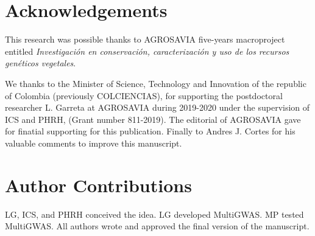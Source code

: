 \documentclass{article}
\begin{document}
\section{Acknowledgements}
This research was possible thanks to AGROSAVIA five-years macroproject entitled \emph{Investigación en conservación, caracterización y uso de los recursos genéticos vegetales}.
 
We thanks to the Minister of Science, Technology and Innovation of the republic of Colombia (previously COLCIENCIAS), for supporting the postdoctoral researcher L. Garreta at AGROSAVIA during 2019-2020 under the supervision of ICS and PHRH, (Grant number 811-2019). The editorial of AGROSAVIA gave for finatial supporting for this publication. Finally to Andres J. Cortes for his valuable comments to improve this manuscript.

\section{Author Contributions}
LG, ICS, and PHRH conceived the idea. LG developed MultiGWAS. MP tested MultiGWAS. All authors wrote and approved the final version of the manuscript.


%
%

\printbibliography
%
%
\end{document}
